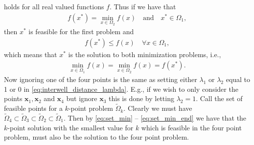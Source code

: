 holds for all real valued functions $f$. Thus if we have that
%
\begin{align}
 f(x^*) = \min_{x \in \Omega_2} f(x) \quad \text{and} \quad x^* \in \Omega_1,
\end{align}
%
then $x^*$ is feasible for the first problem and 
%
\begin{align}
f(x^*) \leq f(x) \quad \forall x \in \Omega_1,
\end{align}
%
which means that $x^*$ is the solution to both minimization problems, i.e.,
%
\begin{align}
\min_{x \in \Omega_1} f(x) = \min_{x \in \Omega_2} f(x) = f(x^*).
\label{eq:set_min_end}
\end{align}
% 
Now ignoring one of the four points is the same as setting either $\lambda_1$ or
$\lambda_2$ equal to 1 or 0 in \eqref{eq:interwell_distance_lambda}. E.g., if we
wish to only consider the points $\textbf{x}_1, \textbf{x}_2$ and $\textbf{x}_4$
but ignore $\textbf{x}_3$ this is done by letting $\lambda_2 = 1$. Call the set
of feasible points for a $k$-point problem $\tilde{\Omega}_k$. Clearly we must
have $\tilde{\Omega}_4 \subset \tilde{\Omega}_3 \subset \tilde{\Omega}_2 \subset \tilde{\Omega}_1$. Then by 
\eqref{eq:set_min} -- \eqref{eq:set_min_end} we have that the $k$-point solution 
with the smallest value for $k$ which is feasible in the four point problem, 
must also be the solution to the four point problem.

%

